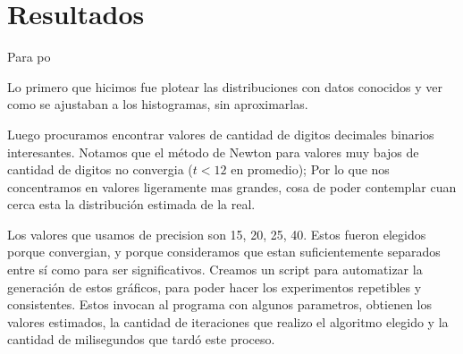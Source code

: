 \section{Resultados}

Para po

Lo primero que hicimos fue plotear las distribuciones con datos conocidos y ver como se ajustaban a los
histogramas, sin aproximarlas.


Luego procuramos encontrar valores de cantidad de digitos decimales binarios interesantes. Notamos que el m\'etodo de Newton
para valores muy bajos de cantidad de digitos no convergia ($t < 12$ en promedio); Por lo que nos concentramos en valores
ligeramente mas grandes, cosa de poder contemplar cuan cerca esta la distribuci\'on estimada de la real.

Los valores que usamos de precision son 15, 20, 25, 40. Estos fueron elegidos porque convergian, y porque consideramos que estan
suficientemente separados entre s\'i como para ser significativos. Creamos un script para automatizar la generaci\'on de estos gr\'aficos,
para poder hacer los experimentos repetibles y consistentes. Estos invocan al programa con algunos parametros, obtienen los
valores estimados, la cantidad de iteraciones que realizo el algoritmo elegido y la cantidad de milisegundos que tard\'o este proceso.


